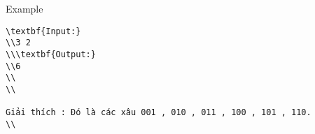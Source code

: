 Example
\begin{verbatim}
\textbf{Input:}
\\3 2
\\\textbf{Output:}
\\6
\\
\\

Giải thích : Đó là các xâu 001 , 010 , 011 , 100 , 101 , 110.
\\\end{verbatim}